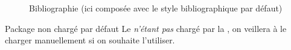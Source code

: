\begin{figure}[htbp]
  \centering
  \caption[Bibliographie]{Bibliographie (ici composée avec le style
    bibliographique par défaut)}
  \label{fig-printbibliography}
\end{figure}

\begin{dbwarning}{Package  non chargé par défaut}{}
  Le  \emph{n'étant pas} chargé par la \yatcl, on veillera
  à le charger manuellement si on souhaite l'utiliser.
\end{dbwarning}

%
\iffalse
\fi
